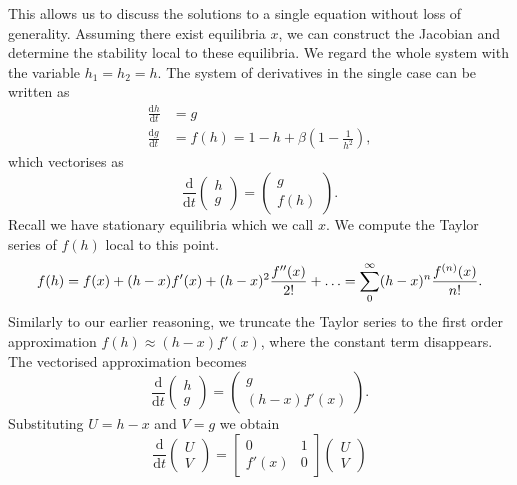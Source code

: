 This allows us to discuss the solutions to a single equation without loss of generality.
Assuming there exist equilibria \(x\), 
we can construct the Jacobian and determine the stability local to these equilibria.
We regard the whole system with the variable \(h_1=h_2=h\).
The system of derivatives in the single case can be written as
\begin{equation}
    \begin{aligned}
        \frac{\mathrm{d}h}{\mathrm{d}t} &= g \\
        \frac{\mathrm{d}g}{\mathrm{d}t} &= f(h) = 1-h +\beta\left(1-\frac{1}{h^2}\right),
    \end{aligned}
\end{equation}
which vectorises as
\begin{equation}
    \frac{\mathrm{d}}{\mathrm{d}t} \begin{pmatrix}
        h \\
        g
    \end{pmatrix} = \begin{pmatrix}
        g \\
        f(h)
    \end{pmatrix}.
\end{equation}
Recall we have stationary equilibria which we call \(x\). We compute the Taylor series of \(f(h)\) local to this point.
\begin{equation}
    f(h) = f(x) + (h-x)f'(x) + (h-x)^2\frac{f''(x)}{2!} + \mathellipsis =\sum_{0}^{\infty} (h-x)^n\frac{f^{(n)}(x)}{n!}.
\end{equation}
Similarly to our earlier reasoning, we truncate the Taylor series to the first order approximation $f(h) \approx (h-x)f'(x)$,
where the constant term disappears.
The vectorised approximation becomes
\begin{equation}
    \frac{\mathrm{d}}{\mathrm{d}t}\begin{pmatrix}
        h \\
        g
    \end{pmatrix} = \begin{pmatrix}
        g \\
        (h-x)f'(x)
    \end{pmatrix}.
\end{equation}
Substituting \(U = h-x\) and \(V = g\) we obtain
\begin{equation}
    \frac{\mathrm{d}}{\mathrm{d}t} \begin{pmatrix}
        U \\
        V
    \end{pmatrix} = \begin{bmatrix}
        0 & 1 \\
        f'(x) & 0
    \end{bmatrix} \begin{pmatrix}
        U \\
        V
    \end{pmatrix} 
\end{equation}
